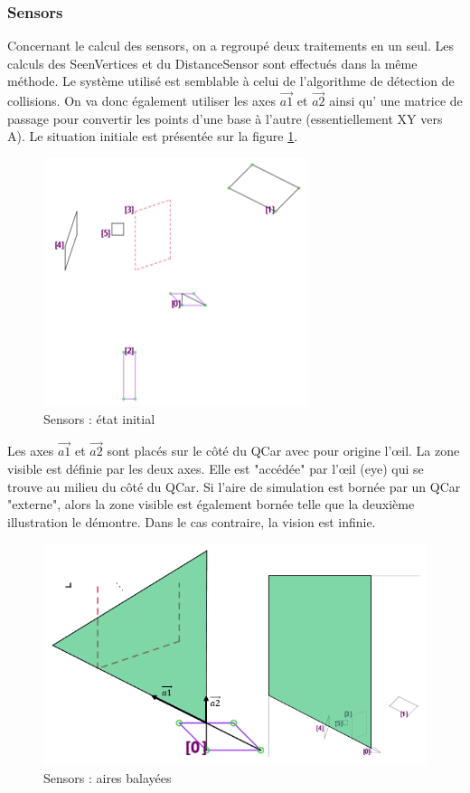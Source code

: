 \documentclass[a4paper, 12pt]{article}
\begin{document}
\subsubsection{Sensors}
Concernant le calcul des sensors, on a regroupé deux traitements en un seul. Les calculs des SeenVertices et du DistanceSensor sont effectués dans la même méthode.
Le système utilisé est semblable à celui de l'algorithme de détection de collisions. On va donc également utiliser les axes $\vec{a1}$ et $\vec{a2}$ ainsi qu' une matrice de passage pour convertir les points d'une base à l'autre (essentiellement XY vers A).
Le situation initiale est présentée sur la figure \ref{fig:1initialstatesensors}.
\begin{figure}[H]
\centering
\includegraphics[width=0.5\linewidth]{includes/images/sensors/1_initialState}
\caption{Sensors : état initial}
\label{fig:1initialstatesensors}
\end{figure}
Les axes $\vec{a1}$ et $\vec{a2}$ sont placés sur le côté  du QCar avec pour origine l'œil. La zone visible est définie par les deux axes. Elle est "accédée" par l'œil (eye) qui se trouve au milieu du côté  du QCar. Si l'aire de simulation est bornée par un QCar "externe", alors la zone visible est également bornée telle que la deuxième illustration le démontre. Dans le cas contraire, la vision est infinie. 
\begin{figure}[H]
\centering
\includegraphics[width=0.7\linewidth]{includes/images/sensors/2_seenAreas}
\caption{Sensors : aires balayées}
\label{fig:2seenareas}
\end{figure}
\end{document}
